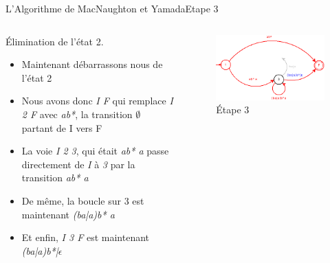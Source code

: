 \documentclass{beamer}
\begin{document}
\begin{frame}{L'Algorithme de MacNaughton et Yamada}{Etape 3}
     \begin{columns}[T]
     \begin{column}{.48\textwidth}
         {\fontsize{8}{9}\selectfont Élimination de l'état 2.}
         \begin{itemize}
         
             \item {\fontsize{7}{8}\selectfont Maintenant débarrassons nous de l'état 2}
             \item {\fontsize{7}{8}\selectfont Nous avons donc \textit{I F} qui remplace \textit{I 2 F} avec \textit{ab*}, la transition $\emptyset$ partant de I vers F}
             \item {\fontsize{7}{8}\selectfont La voie \textit{I 2 3}, qui était \textit{ab* a} passe directement de \textit{I} à \textit{3} par la transition \textit{ab* a}}
             \item {\fontsize{7}{8}\selectfont De même, la boucle sur 3 est maintenant \textit{(ba|a)b* a}}
             \item {\fontsize{7}{8}\selectfont Et enfin, \textit{I 3 F} est maintenant \textit{(ba|a)b*|$\epsilon$}}
             
         \end{itemize}
     \end{column}
     
     \begin{column}{.48\textwidth}
     \begin{figure}
     \includegraphics[scale=0.37]{Diagramme4_5.png}
     \centering
     \caption{Étape 3}     
     \end{figure}
     \end{column}
        
     \end{columns}
\end{frame}
\end{document}
